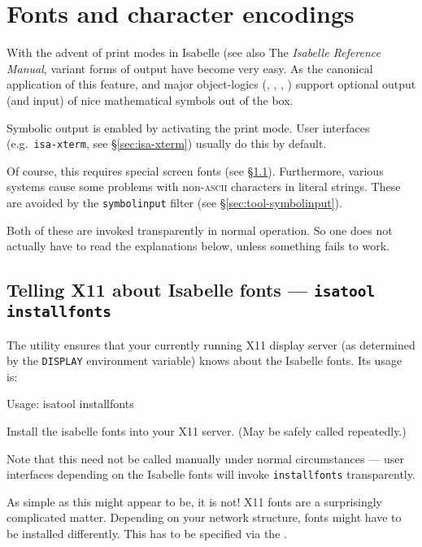 
\chapter{Fonts and character encodings}

With the advent of print modes in Isabelle (see also The
\emph{Isabelle Reference Manual}, variant forms of output have become
very easy. As the canonical application of this feature, {\Pure} and
major object-logics (\FOL, \ZF, \HOL, \HOLCF) support optional output
(and input) of nice mathematical symbols out of the box.

Symbolic output is enabled by activating the  print
mode. User interfaces (e.g.\ \texttt{isa-xterm}, see
\S\ref{sec:isa-xterm}) usually do this by default.

\medskip Of course, this requires special screen fonts (see
\S\ref{sec:tool-installfonts}). Furthermore, various {\ML} systems
cause some problems with non-\textsc{ascii} characters in literal
strings. These are avoided by the \texttt{symbolinput} filter (see
\S\ref{sec:tool-symbolinput}).

Both of these are invoked transparently in normal operation. So one
does not actually have to read the explanations below, unless
something fails to work.


\section{Telling X11 about Isabelle fonts --- \texttt{isatool installfonts}}
\label{sec:tool-installfonts}

The  utility ensures that your currently running
X11 display server (as determined by the \texttt{DISPLAY} environment
variable) knows about the Isabelle fonts. Its usage is:
\begin{ttbox}
Usage: isatool installfonts

  Install the isabelle fonts into your X11 server.
  (May be safely called repeatedly.)
\end{ttbox}
Note that this need not be called manually under normal circumstances
--- user interfaces depending on the Isabelle fonts will invoke
\texttt{installfonts} transparently.

\medskip As simple as this might appear to be, it is not! X11 fonts
are a surprisingly complicated matter. Depending on your network
structure, fonts might have to be installed differently. This has to
be specified via the .

